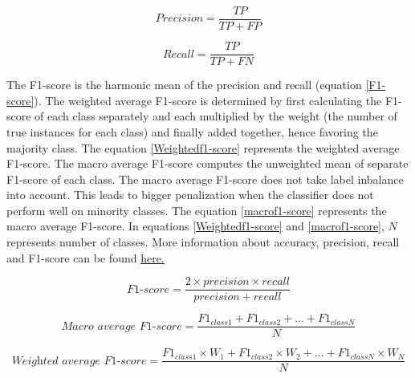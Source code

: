 \begin{equation}\label{precision}
\textit{Precision} = \frac{TP}{TP + FP}
\end{equation}

\begin{equation}\label{recall}
\textit{Recall} = \frac{TP}{TP + FN}
\end{equation}


The F1-score is the harmonic mean of the precision and recall (equation \ref{F1-score}). The weighted average F1-score is determined by first calculating the F1-score of each class separately and each multiplied by the weight (the number of true instances for each class) and finally added together, hence favoring the majority class\footnotemark. The equation \ref{Weightedf1-score} represents the weighted average F1-score. The macro average F1-score computes the unweighted mean of separate F1-score of each class. The macro average F1-score does not take label inbalance into account\footnotemark[\value{footnote}]. This leads to bigger penalization when the classifier does not perform well on minority classes. The equation \ref{macrof1-score} represents the macro average F1-score. In equations \ref{Weightedf1-score} and \ref{macrof1-score}, $N$ represents number of classes. More information about accuracy, precision, recall and F1-score can be found \href{https://en.wikipedia.org/wiki/Precision_and_recall}{here.}



\begin{equation}\label{F1-score}
\textit{F1-score} = \frac{2 \times precision \times recall}{precision + recall}
\end{equation}


\begin{equation}\label{macrof1-score} 
\textit{Macro average F1-score} =  \frac{F1_{class1} + F1_{class2}+ ... + F1_{classN}}{N}
\end{equation}


\begin{equation}\label{Weightedf1-score} 
\textit{Weighted average F1-score} =  \frac{F1_{class1} \times W_1 + F1_{class2} \times W_2 + ... + F1_{classN} \times W_N}{N}
\end{equation}

